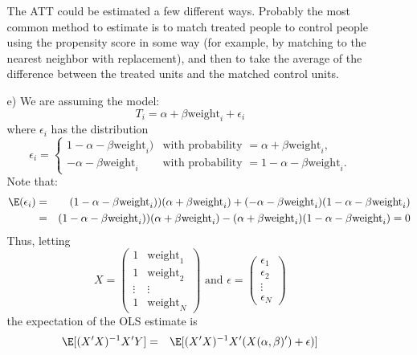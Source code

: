\documentclass{article}
\begin{document}
\begin{itemize}
\begin{itemize}
       The ATT could be estimated a few different ways. 
       Probably the most common method to estimate is to
       match treated people to control people using the propensity score in some way
       (for example, by matching to the nearest neighbor with replacement), 
       and then
       to take the average of the difference between 
       the treated units and the matched control units.
     \item[e)] We are assuming the model:
     $$
       T_i = \alpha + \beta\text{weight}_i + \epsilon_i
     $$
     where $\epsilon_i$ has the distribution
     $$
       \epsilon_i = \left\{ 
         \begin{array}{ll}
           1-\alpha - \beta\text{weight}_i) & \text{with probability }=\alpha + \beta\text{weight}_i,\\
           -\alpha - \beta\text{weight}_i & \text{with probability } = 1 - \alpha -\beta\text{weight}_i.
         \end{array}
       \right.
     $$
     Note that:
     \begin{eqnarray*}
       \E(\epsilon_i) &=&  (1-\alpha - \beta\text{weight}_i))(\alpha + \beta\text{weight}_i)
       + ( -\alpha - \beta\text{weight}_i )(1 - \alpha -\beta\text{weight}_i) \\
       &=& (1-\alpha - \beta\text{weight}_i))(\alpha + \beta\text{weight}_i)
       - ( \alpha + \beta\text{weight}_i )(1 - \alpha -\beta\text{weight}_i) = 0
     \end{eqnarray*}
     Thus, letting 
     $$
       X = \left(
        \begin{array}{cc}
          1 & \text{weight}_1 \\
          1 & \text{weight}_2 \\
          \vdots & \vdots \\
          1 & \text{weight}_N
        \end{array}
      \right)
      \text{ and }
      \epsilon = \left(
        \begin{array}{c}
         \epsilon_1 \\
         \epsilon_2\\
         \vdots \\
         \epsilon_N
        \end{array}
      \right)
     $$ 
     the expectation of the OLS estimate is
     \begin{eqnarray*}
       \E[(X'X)^{-1}X'Y] &=& \E[(X'X)^{-1}X'(X(\alpha, \beta)') + \epsilon)]     \\

\end{eqnarray*}
\end{itemize}
\end{itemize}
\end{document}

